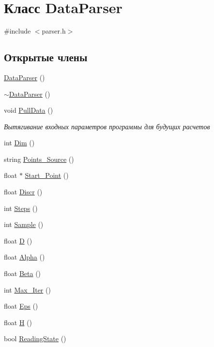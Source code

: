 \hypertarget{class_data_parser}{}\section{Класс Data\+Parser}
\label{class_data_parser}


{\ttfamily \#include $<$parser.\+h$>$}

\subsection*{Открытые члены}
\begin{DoxyCompactItemize}
\item 
\hyperlink{class_data_parser_adde3fdb08b6d298dac0bdf59b94d77c9}{Data\+Parser} ()
\item 
\hyperlink{class_data_parser_a3814c58e35d81db3d7a1d5b96041efd5}{$\sim$\+Data\+Parser} ()
\item 
void \hyperlink{class_data_parser_ae80dfe8258521c73d2dab00b1f1f74aa}{Pull\+Data} ()
\begin{DoxyCompactList}\small\item\em Вытягивание входных параметров программы для будущих расчетов \end{DoxyCompactList}\item 
int \hyperlink{class_data_parser_aabdef48a661a4737ec01d3d31e00ccb3}{Dim} ()
\item 
string \hyperlink{class_data_parser_ab1c4d04690667c929da9c8cc7a08cf57}{Points\+\_\+\+Source} ()
\item 
float $\ast$ \hyperlink{class_data_parser_a9d821449a8250d30ad65c976885a0f48}{Start\+\_\+\+Point} ()
\item 
float \hyperlink{class_data_parser_a1f0cbc39bbf7e976c53fad6a4a389417}{Discr} ()
\item 
int \hyperlink{class_data_parser_a404e5625180ca25b07a84971d8ff1bd5}{Steps} ()
\item 
int \hyperlink{class_data_parser_ae4a86a8c02c03d52881be3e5411bc572}{Sample} ()
\item 
float \hyperlink{class_data_parser_af0cc37893ec5aa4aa05130cea1988d53}{D} ()
\item 
float \hyperlink{class_data_parser_a12892b6cc8bb7b24159e7709852649cd}{Alpha} ()
\item 
float \hyperlink{class_data_parser_a31d430da03dca13e7cec8f84401c12a6}{Beta} ()
\item 
int \hyperlink{class_data_parser_a439f05ed92743973cc8dc6da38e50868}{Max\+\_\+\+Iter} ()
\item 
float \hyperlink{class_data_parser_ab82aae2922755c17eafa460578ff587b}{Eps} ()
\item 
float \hyperlink{class_data_parser_a124b97cf683480bcb705256af645e446}{H} ()
\item 
bool \hyperlink{class_data_parser_a0ba5763774146b6ea7c7c6504ae47053}{Reading\+State} ()
\end{DoxyCompactItemize}



